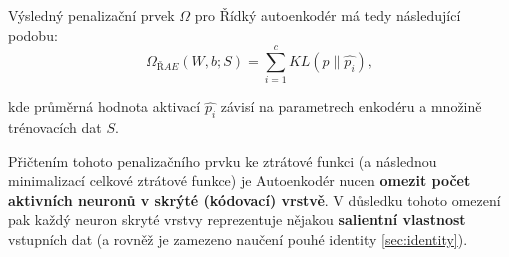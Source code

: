 Výsledný penalizační prvek $\Omega$ pro Řídký autoenkodér má tedy následující podobu:
\begin{equation}
    \Omega_{ŘAE}(W, b; S) = \sum_{i=1}^{c}KL(p \parallel \hat{p_i}),
\end{equation}

kde průměrná hodnota aktivací $\hat{p_i}$ závisí na parametrech enkodéru a množině trénovacích dat $S$. 

Přičtením tohoto penalizačního prvku ke ztrátové funkci (a následnou minimalizací celkové ztrátové funkce) je Autoenkodér nucen \textbf{omezit počet aktivních neuronů v skrýté (kódovací) vrstvě}.
V důsledku tohoto omezení pak každý neuron skryté vrstvy reprezentuje nějakou \textbf{salientní vlastnost} vstupních dat (a rovněž je zamezeno naučení pouhé identity \autoref{sec:identity}).
